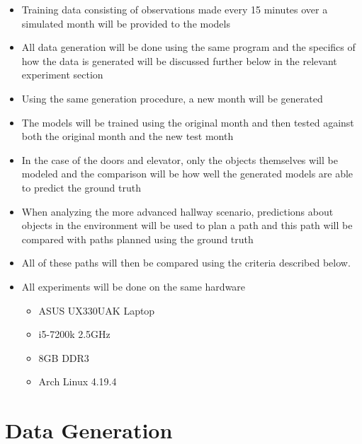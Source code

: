   \begin{itemize}

    \item Training data consisting of observations made every 15 minutes over
          a simulated month will be provided to the models

    \item All data generation will be done using the same program and the
          specifics of how the data is generated will be discussed further
          below in the relevant experiment section

    \item Using the same generation procedure, a new month will be generated

    \item The models will be trained using the original month and then tested
          against both the original month and the new test month

    \item In the case of the doors and elevator, only the objects themselves
          will be modeled and the comparison will be how well the generated
          models are able to predict the ground truth

    \item When analyzing the more advanced hallway scenario, predictions about
          objects in the environment will be used to plan a path and this path
          will be compared with paths planned using the ground truth

    \item All of these paths will then be compared using the criteria described
          below.

    \item All experiments will be done on the same hardware
      \begin{itemize}
        \item ASUS UX330UAK Laptop
        \item i5-7200k 2.5GHz
        \item 8GB DDR3
        \item Arch Linux 4.19.4
      \end{itemize}

  \end{itemize}

  \section{ Data Generation }

